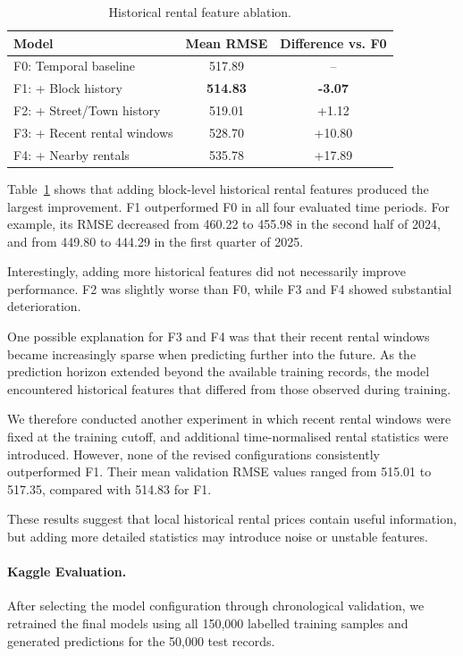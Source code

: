\documentclass[11pt,a4paper]{article}
\begin{document}
\begin{table}[t]
\centering
\caption{Historical rental feature ablation.}
\label{tab:historical_ablation}
\small
\begin{tabular}{lcc}
\hline
Model & Mean RMSE & Difference vs. F0 \\
\hline
F0: Temporal baseline & 517.89 & -- \\
F1: + Block history & \textbf{514.83} & \textbf{-3.07} \\
F2: + Street/Town history & 519.01 & +1.12 \\
F3: + Recent rental windows & 528.70 & +10.80 \\
F4: + Nearby rentals & 535.78 & +17.89 \\
\hline
\end{tabular}
\end{table}

Table~\ref{tab:historical_ablation} shows that adding block-level historical rental features produced the largest improvement. F1 outperformed F0 in all four evaluated time periods. For example, its RMSE decreased from 460.22 to 455.98 in the second half of 2024, and from 449.80 to 444.29 in the first quarter of 2025.

Interestingly, adding more historical features did not necessarily improve performance. F2 was slightly worse than F0, while F3 and F4 showed substantial deterioration.

One possible explanation for F3 and F4 was that their recent rental windows became increasingly sparse when predicting further into the future. As the prediction horizon extended beyond the available training records, the model encountered historical features that differed from those observed during training.

We therefore conducted another experiment in which recent rental windows were fixed at the training cutoff, and additional time-normalised rental statistics were introduced. However, none of the revised configurations consistently outperformed F1. Their mean validation RMSE values ranged from 515.01 to 517.35, compared with 514.83 for F1.

These results suggest that local historical rental prices contain useful information, but adding more detailed statistics may introduce noise or unstable features.

\paragraph{Kaggle Evaluation.}
After selecting the model configuration through chronological validation, we retrained the final models using all 150,000 labelled training samples and generated predictions for the 50,000 test records.
\end{document}
